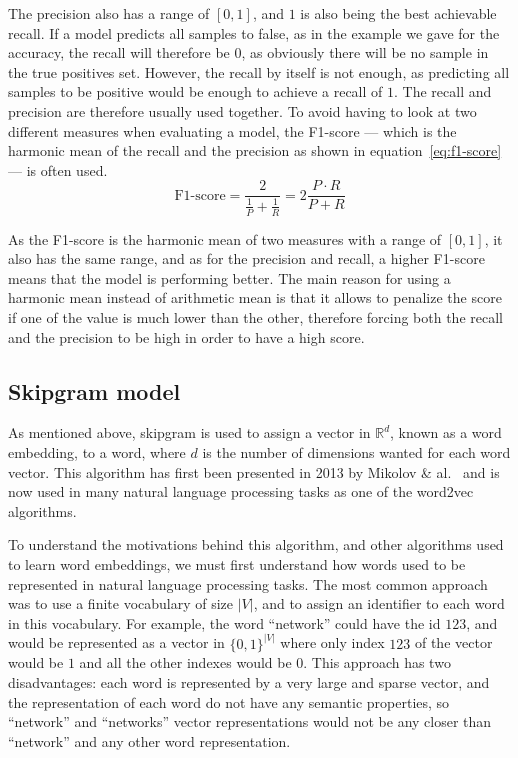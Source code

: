 The precision also has a range of $[0, 1]$, and $1$ is also being the best
achievable recall. If a model predicts all samples to false, as in the example
we gave for the accuracy, the recall will therefore be $0$, as obviously there
will be no sample in the true positives set. However, the recall by itself is
not enough, as predicting all samples to be positive would be enough to achieve
a recall of $1$. The recall and precision are therefore usually used together.
To avoid having to look at two different measures when evaluating a model, the
F1-score --- which is the harmonic mean of the recall and the precision as shown
in equation~\ref{eq:f1-score} --- is often used.
\begin{equation}
  \label{eq:f1-score}
  \text{F1-score} = \dfrac{2}{\frac{1}{P} + \frac{1}{R}} = 2\frac{P\cdot R}{P + R}
\end{equation}

As the F1-score is the harmonic mean of two measures with a range of $[0, 1]$,
it also has the same range, and as for the precision and recall, a higher
F1-score means that the model is performing better.
The main reason for using a harmonic mean instead of arithmetic mean is that it
allows to penalize the score if one of the value is much lower than the other,
therefore forcing both the recall and the precision to be high in order to have
a high score.
\subsection{\label{ssec:skipgram-model}Skipgram model}
As mentioned above, skipgram is used to assign a vector in $\mathbb{R}^d$, known
as a word embedding, to a word, where $d$ is the number of dimensions wanted for
each word vector. This algorithm has first been presented in 2013 by Mikolov \&
al.~\cite{DBLP:journals/corr/MikolovSCCD13} and is now used in many natural
language processing tasks as one of the word2vec algorithms.

To understand the motivations behind this algorithm, and other algorithms used
to learn word embeddings, we must first understand how words used to be
represented in natural language processing tasks. The most common approach was
to use a finite vocabulary of size $|V|$, and to assign an identifier to each
word in this vocabulary. For example, the word ``network'' could have the id
$123$, and would be represented as a vector in ${\{0,1\}}^{|V|}$ where only index
$123$ of the vector would be $1$ and all the other indexes would be $0$. This
approach has two disadvantages: each word is represented by a very large and
sparse vector, and the representation of each word do not have any semantic
properties, so ``network'' and ``networks'' vector representations would not be
any closer than ``network'' and any other word representation.

